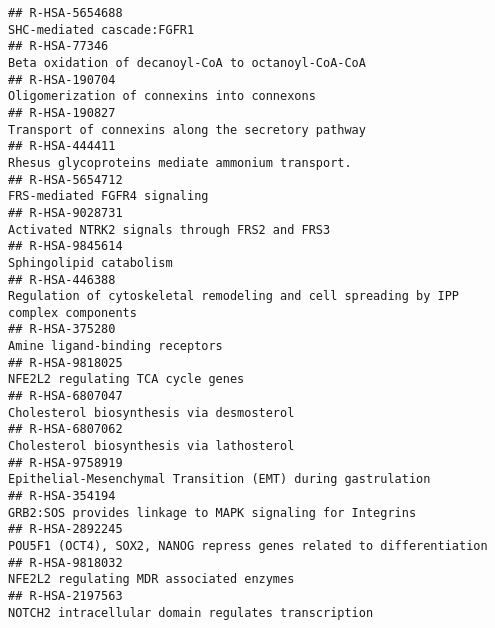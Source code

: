 \documentclass[
]{article}
\begin{document}
\begin{verbatim}
## R-HSA-5654688                                                                                                           SHC-mediated cascade:FGFR1
## R-HSA-77346                                                                                     Beta oxidation of decanoyl-CoA to octanoyl-CoA-CoA
## R-HSA-190704                                                                                           Oligomerization of connexins into connexons
## R-HSA-190827                                                                                    Transport of connexins along the secretory pathway
## R-HSA-444411                                                                                      Rhesus glycoproteins mediate ammonium transport.
## R-HSA-5654712                                                                                                         FRS-mediated FGFR4 signaling
## R-HSA-9028731                                                                                        Activated NTRK2 signals through FRS2 and FRS3
## R-HSA-9845614                                                                                                              Sphingolipid catabolism
## R-HSA-446388                                                    Regulation of cytoskeletal remodeling and cell spreading by IPP complex components
## R-HSA-375280                                                                                                        Amine ligand-binding receptors
## R-HSA-9818025                                                                                                    NFE2L2 regulating TCA cycle genes
## R-HSA-6807047                                                                                             Cholesterol biosynthesis via desmosterol
## R-HSA-6807062                                                                                             Cholesterol biosynthesis via lathosterol
## R-HSA-9758919                                                                          Epithelial-Mesenchymal Transition (EMT) during gastrulation
## R-HSA-354194                                                                            GRB2:SOS provides linkage to MAPK signaling for Integrins 
## R-HSA-2892245                                                                  POU5F1 (OCT4), SOX2, NANOG repress genes related to differentiation
## R-HSA-9818032                                                                                             NFE2L2 regulating MDR associated enzymes
## R-HSA-2197563                                                                                  NOTCH2 intracellular domain regulates transcription

\end{verbatim}
\end{document}
